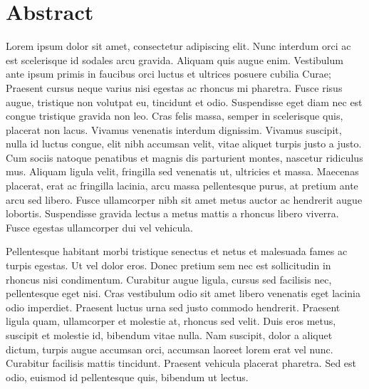 
\chapter*{Abstract}

Lorem ipsum dolor sit amet, consectetur adipiscing elit. Nunc interdum
orci ac est scelerisque id sodales arcu gravida. Aliquam quis augue
enim. Vestibulum ante ipsum primis in faucibus orci luctus et ultrices
posuere cubilia Curae; Praesent cursus neque varius nisi egestas ac
rhoncus mi pharetra. Fusce risus augue, tristique non volutpat eu,
tincidunt et odio. Suspendisse eget diam nec est congue tristique
gravida non leo. Cras felis massa, semper in scelerisque quis, placerat
non lacus. Vivamus venenatis interdum dignissim. Vivamus suscipit, nulla
id luctus congue, elit nibh accumsan velit, vitae aliquet turpis justo a
justo. Cum sociis natoque penatibus et magnis dis parturient montes,
nascetur ridiculus mus. Aliquam ligula velit, fringilla sed venenatis
ut, ultricies et massa. Maecenas placerat, erat ac fringilla lacinia,
arcu massa pellentesque purus, at pretium ante arcu sed libero. Fusce
ullamcorper nibh sit amet metus auctor ac hendrerit augue
lobortis. Suspendisse gravida lectus a metus mattis a rhoncus libero
viverra. Fusce egestas ullamcorper dui vel vehicula.

Pellentesque habitant morbi tristique senectus et netus et malesuada
fames ac turpis egestas. Ut vel dolor eros. Donec pretium sem nec est
sollicitudin in rhoncus nisi condimentum. Curabitur augue ligula, cursus
sed facilisis nec, pellentesque eget nisi. Cras vestibulum odio sit amet
libero venenatis eget lacinia odio imperdiet. Praesent luctus urna sed
justo commodo hendrerit. Praesent ligula quam, ullamcorper et molestie
at, rhoncus sed velit. Duis eros metus, suscipit et molestie id,
bibendum vitae nulla. Nam suscipit, dolor a aliquet dictum, turpis augue
accumsan orci, accumsan laoreet lorem erat vel nunc. Curabitur facilisis
mattis tincidunt. Praesent vehicula placerat pharetra. Sed est odio,
euismod id pellentesque quis, bibendum ut lectus.


